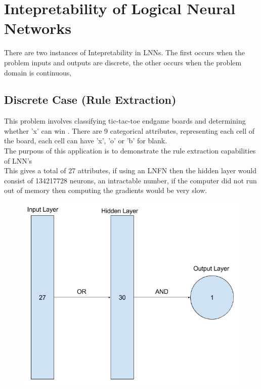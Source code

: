 \section{Intepretability of Logical Neural Networks}
There are two instances of Intepretability in LNNs. The first occurs when the problem inputs and outputs are discrete, the other occurs when the problem domain is continuous, 

\subsection{Discrete Case (Rule Extraction)}
This problem involves classifying tic-tac-toe endgame boards and determining whether 'x' can win \cite{Lichman:2013}. There are 9 categorical attributes, representing each cell of the board, each cell can have 'x', 'o' or 'b' for blank.\\

The purpous of this application is to demonstrate the rule extraction capabilities of LNN's\\

This gives a total of 27 attributes, if using an LNFN then the hidden layer would consist of 134217728 neurons, an intractable number, if the computer did not run out of memory then computing the gradients would be very slow.

\begin{figure}[H]
	\centering
	\begin{minipage}[b]{0.5\textwidth}
		\includegraphics[width=\textwidth]{Tic-Tac-Toe-Net.png}
		\caption{}
		\label{fig:tic-tac-toe-net}
	\end{minipage}
	\hfill
\end{figure}

